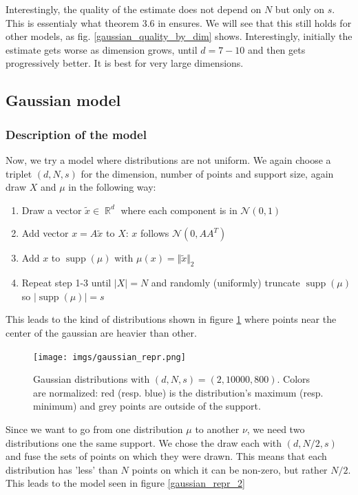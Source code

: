 \documentclass[11pt]{article}
\DeclareMathOperator\supp{supp}
\DeclareMathOperator\R{\mathbb{R}}
\begin{document}
Interestingly, the quality of the estimate does not depend on $N$ but only on $s$. This is essentialy what theorem 3.6 in \cite{Flowtree} ensures. We will see that this still holds for other models, as fig. \ref{gaussian_quality_by_dim} shows. Interestingly, initially the estimate gets worse as dimension grows, until $d=7-10$ and then gets progressively better. It is best for very large dimensions. 

\newpage
\subsection{Gaussian model}

\subsubsection{Description of the model}
Now, we try a model where distributions are not uniform. We again choose a triplet $(d, N, s)$ for the dimension, number of points and support size, again draw $X$ and $\mu$ in the following way:

\begin{enumerate}
\item Draw a vector $\tilde{x} \in \R^d$ where each component is in $\mathcal{N}(0, 1)$
\item Add vector $x = A\tilde{x}$ to $X$: $x$ follows $\mathcal{N}(0, AA^T)$
\item Add $x$ to $\supp(\mu)$ with $\mu(x) = \Vert \tilde{x} \Vert_2$
\item Repeat step 1-3 until $\vert X \vert = N$ and randomly (uniformly)  truncate $\supp(\mu)$ so $\vert \supp(\mu) \vert = s$
\end{enumerate}

This leads to the kind of distributions shown in figure \ref{gaussian_repr} where points near the center of the gaussian are heavier than other.

\begin{figure}[h]
\centering
\texttt{[image: imgs/gaussian\_repr.png]}
\caption{Gaussian distributions with $(d, N, s) = (2, 10000, 800)$. Colors are normalized: red (resp. blue) is the distribution's maximum (resp. minimum) and grey points are outside of the support.}
\label{gaussian_repr}
\end{figure}

Since we want to go from one distribution $\mu$ to another $\nu$, we need two distributions one the same support. We chose the draw each with $(d, N/2, s)$ and fuse the sets of points on which they were drawn. This means that each distribution has 'less' than $N$ points on which it can be non-zero, but rather $N/2$. 
This leads to the model seen in figure \ref{gaussian_repr_2}
\end{document}
